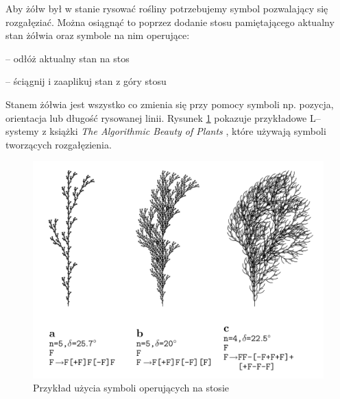 \documentclass[inz,shortabstract]{iithesis}
\begin{document}
        Aby żółw był w stanie rysować rośliny potrzebujemy symbol pozwalający się rozgałęziać. Można osiągnąć to poprzez dodanie stosu pamiętającego aktualny stan żółwia oraz symbole na nim operujące:
        \begin{description}[itemsep=2pt, parsep=2pt, topsep=2pt, partopsep=2pt]
            \item[{[}] -- odłóż aktualny stan na stos
            \item[{]}] -- ściągnij i zaaplikuj stan z góry stosu 
        \end{description}
        Stanem żółwia jest wszystko co zmienia się przy pomocy symboli np. pozycja, orientacja lub długość rysowanej linii. Rysunek \ref{fig:lsystemPlants} pokazuje przykładowe L--systemy z książki \textit{The Algorithmic Beauty of Plants}  \cite{plants}, które używają symboli tworzących rozgałęzienia. 
        \begin{figure}[H]
            \includegraphics[width=\linewidth]{lsystemPlants.png}
            \caption{Przykład użycia symboli operujących na stosie \cite{plants}} 
            \label{fig:lsystemPlants}
        \end{figure}
        
\end{document}

